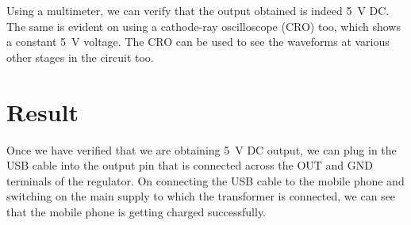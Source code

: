 \documentclass[journal,12pt,twocolumn]{IEEEtran}
\numberwithin{equation}{section}
\numberwithin{figure}{section}
\begin{document}
	Using a multimeter, we can verify that the output obtained is indeed \SI{5}{\volt} DC. The same is evident on using a cathode-ray oscilloscope (CRO) too, which shows a constant \SI{5}{\volt} voltage. The CRO can be used to see the waveforms at various other stages in the circuit too.
	
	\section{Result}	
	Once we have verified that we are obtaining \SI{5}{\volt} DC output, we can plug in the USB cable into the output pin that is connected across the OUT and GND terminals of the regulator. On connecting the USB cable to the mobile phone and switching on the main supply to which the transformer is connected, we can see that the mobile phone is getting charged successfully.
\end{document}
